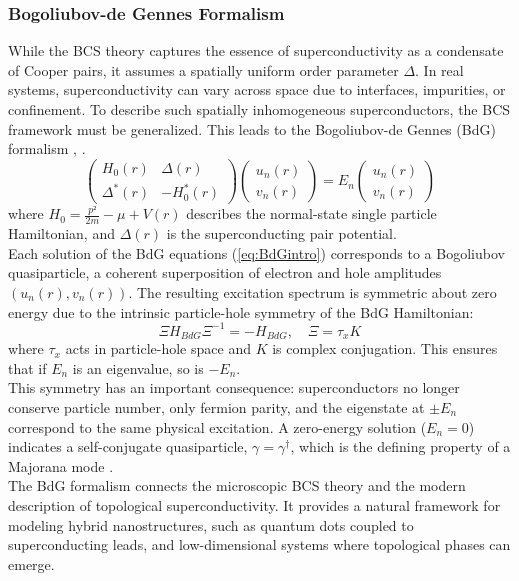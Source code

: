 \subsubsection{Bogoliubov-de Gennes Formalism}
While the BCS theory captures the essence of superconductivity as a condensate of Cooper pairs, it assumes a spatially uniform order parameter $Δ$. In real systems, superconductivity can vary across space due to interfaces, impurities, or confinement. To describe such spatially inhomogeneous superconductors, the BCS framework must be generalized. This leads to the Bogoliubov-de Gennes (BdG) formalism \cite{Cambridge_MBPhysics}, \cite{BCS}.\\
\begin{equation}
  \begin{pmatrix}
  H_0(r) & Δ(r) \\
  Δ^{*}(r) & -H_0^{*}(r)
  \end{pmatrix}
  \begin{pmatrix}
  u_n(r) \\
  v_n(r)
  \end{pmatrix}= E_n
  \begin{pmatrix}
  u_n(r) \\
  v_n(r)
  \end{pmatrix}
  \label{eq:BdGintro}
\end{equation}
where $H_0 = \frac{p²}{2m}-μ + V(r)$ describes the normal-state single particle Hamiltonian, and $Δ(r)$ is the superconducting pair potential.\\ 
Each solution of the BdG equations (\ref{eq:BdGintro}) corresponds to a Bogoliubov quasiparticle, a coherent superposition of electron and hole amplitudes $(u_n(r), v_n(r))$. The resulting excitation spectrum is symmetric about zero energy due to the intrinsic particle-hole symmetry of the BdG Hamiltonian:
\begin{equation}
  Ξ H_{BdG} Ξ^{-1} = -H_{BdG}, \quad Ξ = τ_x K
\end{equation}
where $τ_x$ acts in particle-hole space and $K$ is complex conjugation. This ensures that if $E_n$ is an eigenvalue, so is $-E_n$.\\
This symmetry has an important consequence: superconductors no longer conserve particle number, only fermion parity, and the eigenstate at $± E_n$ correspond to the same physical excitation. A zero-energy solution ($E_n = 0$) indicates a self-conjugate quasiparticle, $γ = γ^{†}$, which is the defining property of a Majorana mode \cite{Topocondmat}.\\
The BdG formalism connects the microscopic BCS theory and the modern description of topological superconductivity. It provides a natural framework for modeling hybrid nanostructures, such as quantum dots coupled to superconducting leads, and low-dimensional systems where topological phases can emerge.  \\

